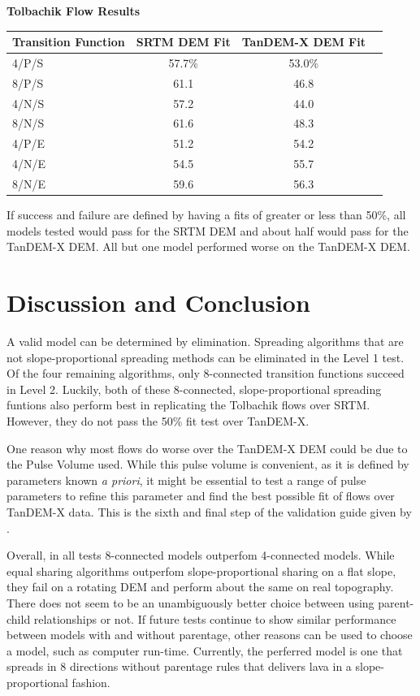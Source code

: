 \documentclass[12pt,letter]{article}
\begin{document}
		\newpage
		\begin{center}
			\textbf{Tolbachik Flow Results}\\
			\begin{tabular}{l c c c}
				\toprule
				Transition Function&SRTM DEM Fit&TanDEM-X DEM Fit\\
				\midrule
				4/P/S & 57.7\%& 53.0\%\\
				8/P/S & 61.1  & 46.8\\
				4/N/S & 57.2  & 44.0\\
				8/N/S & 61.6  & 48.3\\
				4/P/E & 51.2  & 54.2\\
				4/N/E & 54.5  & 55.7\\
				8/N/E & 59.6  & 56.3\\
				
				\bottomrule
			\end{tabular}
		\end{center}

		If success and failure are defined by having a fits of greater or less than 50\%, all models tested would pass for the SRTM DEM and about half would pass for the TanDEM-X DEM. All but one model performed worse on the TanDEM-X DEM.

\section{Discussion and Conclusion}
	A valid model can be determined by elimination. Spreading algorithms that are not slope-proportional spreading methods can be eliminated in the Level 1 test. Of the four remaining algorithms, only 8-connected transition functions succeed in Level 2. Luckily, both of these 8-connected, slope-proportional spreading funtions also perform best in replicating the Tolbachik flows over SRTM. However, they do not pass the 50\% fit test over TanDEM-X.
	
	One reason why most flows do worse over the TanDEM-X DEM could be due to the Pulse Volume used. While this pulse volume is convenient, as it is defined by parameters known \textit{a priori}, it might be essential to test a range of pulse parameters to refine this parameter and find the best possible fit of flows over TanDEM-X data. This is the sixth and final step of the validation guide given by \citet{bayarri2007framework}.
	
	Overall, in all tests 8-connected models outperfom 4-connected models. While equal sharing algorithms outperfom slope-proportional sharing on a flat slope, they fail on a rotating DEM and perform about the same on real topography. There does not seem to be an unambiguously better choice between using parent-child relationships or not. If future tests continue to show similar performance between models with and without parentage, other reasons can be used to choose a model, such as computer run-time. Currently, the perferred model is one that spreads in 8 directions without parentage rules that delivers lava in a slope-proportional fashion.
	
\end{document}
